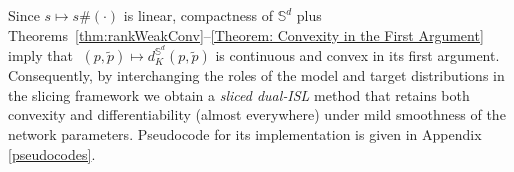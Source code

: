 \documentclass{article}
\begin{document}
Since \(s\mapsto s\#(\cdot)\) is linear, compactness of \(\mathbb S^d\) plus
Theorems~\ref{thm:rankWeakConv}–\ref{Theorem: Convexity in the First Argument} imply that
\(\;(p,\tilde p)\mapsto d_{K}^{\mathbb S^d}(p,\tilde p)\) is continuous
and convex in its first argument.  Consequently, by interchanging the roles of the model and target distributions in the slicing framework we obtain a \emph{sliced dual‐ISL} method that retains both convexity and differentiability (almost everywhere) under mild smoothness of the network parameters. Pseudocode for its implementation is given in Appendix \ref{pseudocodes}.


\end{document}
